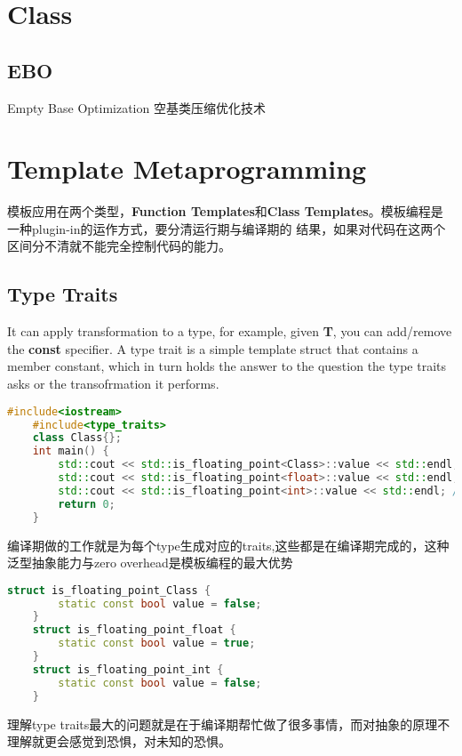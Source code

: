 \section{Class}

\subsection{EBO}

Empty Base Optimization\cite{EmptyBaseOptimization} 空基类压缩优化技术


\section{Template Metaprogramming}

模板应用在两个类型，\textbf{Function Templates}和\textbf{Class Templates}。模板编程是一种plugin-in的运作方式，要分清运行期与编译期的
结果，如果对代码在这两个区间分不清就不能完全控制代码的能力。

\subsection{Type Traits}
It can apply transformation to a type, for example, given \textbf{T}, you can add/remove the \textbf{const} specifier.
A type trait is a simple template struct that contains a member constant, which in turn holds the answer to the question
the type traits asks or the transofrmation it performs.
\begin{lstlisting}[language=c++]
    #include<iostream>
    #include<type_traits>
    class Class{};
    int main() {
        std::cout << std::is_floating_point<Class>::value << std::endl; // 0
        std::cout << std::is_floating_point<float>::value << std::endl; // 1
        std::cout << std::is_floating_point<int>::value << std::endl; // 0
        return 0;
    }
\end{lstlisting} 
编译期做的工作就是为每个type生成对应的traits,这些都是在编译期完成的，这种泛型抽象能力与zero overhead是模板编程的最大优势
\begin{lstlisting}[language=c++]
    struct is_floating_point_Class {
        static const bool value = false;
    }
    struct is_floating_point_float {
        static const bool value = true;
    }
    struct is_floating_point_int {
        static const bool value = false;
    }
\end{lstlisting} 
理解type traits最大的问题就是在于编译期帮忙做了很多事情，而对抽象的原理不理解就更会感觉到恐惧，对未知的恐惧。

